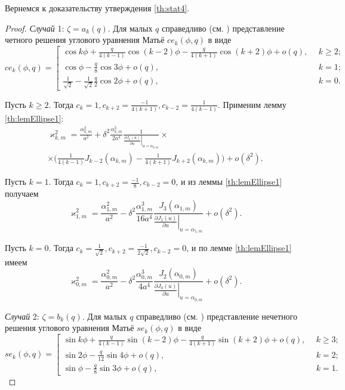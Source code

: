 Вернемся к доказательству утверждения \ref{th:stat4}.
\begin{proof}
\textit{Случай} 1: $\zeta = a_k(q)$.
Для малых $q$ справедливо (см. \cite{wref2}) представление четного решения углового уравнения Матьё $ce_k(\phi, q)$ в виде 
{
\[
ce_k(\phi, q) = 
\left[
\begin{array}{ll}
	\cos{k\phi} + 
	\frac{q}{4(k-1)} \cos{(k-2)\phi} - 
	\frac{q}{4(k+1)} \cos{(k+2)\phi} + o(q), \ \ & k \geq 2;\\
	\cos{\phi} - \frac{q}{8} \cos{3 \phi} + o(q), & k = 1; \\
	\frac{1}{\sqrt{2}} - \frac{1}{\sqrt{2}}\frac{q}{2}\cos{2 \phi} + o(q), & k = 0. 
\end{array}
\right.
\]
}

Пусть $k \geq 2$. Тогда $c_k = 1, c_{k+2}=\frac{-1}{4(k+1)},  c_{k-2}=\frac{1}{4(k-1)}$. Применим лемму \ref{th:lemEllipse1}:
\begin{multline*}
\varkappa_{k, m}^2 = 
\frac{\alpha_{k, m}^2}{a^2} +  \delta^2 \frac{\alpha_{k, m}^3}{2 a^4}\frac{1}{\left.\frac{\partial J_{k} (u)}{\partial u}\right|_{u=\alpha_{k, m}}} \times \\ \times
\biggl(
\frac{1}{4(k-1)} J_{k-2}(\alpha_{k, m}) - \frac{1}{4(k+1)}J_{k+2}(\alpha_{k, m})
\biggr) + o(\delta^2).
\end{multline*}

Пусть $k =1$. Тогда $c_k = 1, c_{k+2}=\frac{-1}{8},  c_{k-2}=0$, и из леммы \ref{th:lemEllipse1} получаем
$$
\varkappa_{1, m}^2 = 
\frac{\alpha_{1, m}^2}{a^2} -  \delta^2 \frac{\alpha_{1, m}^3}{16 a^4}\frac{J_{3}(\alpha_{1, m})}{\left.\frac{\partial J_{1} (u)}{\partial u}\right|_{u=\alpha_{1, m}}}  + o(\delta^2).
$$

Пусть $k =0$. Тогда $c_k = \frac{1}{\sqrt{2}}, c_{k+2}=\frac{-1}{2\sqrt{2}},  c_{k-2}=0$, и по лемме \ref{th:lemEllipse1} имеем
$$
\varkappa_{0, m}^2 = 
\frac{\alpha_{0, m}^2}{a^2} -  \delta^2 \frac{\alpha_{0, m}^3}{4 a^4}\frac{J_{2}(\alpha_{0, m})}{\left.\frac{\partial J_{0} (u)}{\partial u}\right|_{u=\alpha_{0, m}}} 
 + o(\delta^2).
$$

\textit{Случай} 2: $\zeta = b_k(q)$.
Для малых $q$ справедливо (см. \cite{wref2}) представление нечетного решения углового уравнения Матьё $se_k(\phi, q)$ в виде 
{
\[
se_k(\phi, q) = 
\left[
\begin{array}{ll}
	\sin{k\phi} + 
	\frac{q}{4(k-1)} \sin{(k-2)\phi} - 
	\frac{q}{4(k+1)} \sin{(k+2)\phi} + o(q), \ \ & k \geq 3;\\
	\sin{2\phi} - \frac{q}{12} \sin{4 \phi} + o(q), & k = 2; \\
	\sin{\phi} - \frac{q}{8}\sin{3 \phi} + o(q), & k = 1. 
\end{array}
\right.
\]
}


\end{proof}
